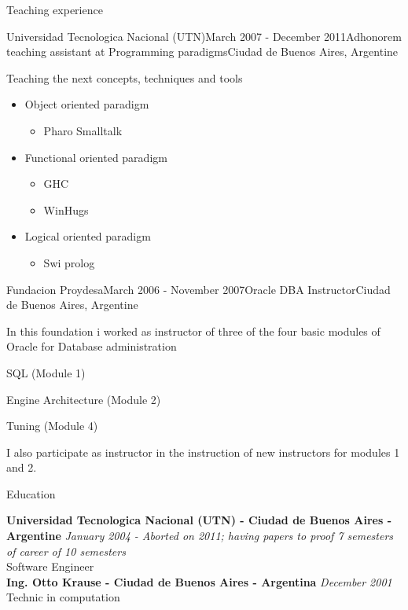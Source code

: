 \documentclass{resume} %
\begin{document}
\begin{rSection}{Teaching experience}
\begin{rSubsection}{Universidad Tecnologica Nacional (UTN)}{March 2007 - December 2011}{Adhonorem teaching assistant at Programming paradigms}{Ciudad de Buenos Aires, Argentine}
\item Teaching the next concepts, techniques and tools
\begin{itemize}
	\item Object oriented paradigm
	\begin{itemize}
		\item Pharo Smalltalk
	\end{itemize}
	\item Functional oriented paradigm
	\begin{itemize}
		\item GHC
		\item WinHugs
	\end{itemize}
	\item Logical oriented paradigm 
	\begin{itemize}
		\item  Swi prolog
	\end{itemize}
\end{itemize}
\end{rSubsection}


\begin{rSubsection}{Fundacion Proydesa}{March 2006 - November 2007}{Oracle DBA Instructor}{Ciudad de Buenos Aires, Argentine}
\item In this foundation i worked as instructor of three of the four basic modules of Oracle for Database administration
\item SQL (Module 1)
\item Engine Architecture (Module 2)
\item Tuning (Module 4)
\item I also participate as instructor in the instruction of new instructors for modules 1 and 2.
\end{rSubsection}


\end{rSection}




\begin{rSection}{Education}


{\bf Universidad Tecnologica Nacional (UTN) - Ciudad de Buenos Aires - Argentine} \hfill {\em January 2004 - Aborted on 2011; having papers to proof 7 semesters of career of 10 semesters } \\ 
Software Engineer  \\

{\bf Ing. Otto Krause - Ciudad de Buenos Aires - Argentina} \hfill {\em December 2001} \\ 
Technic in computation \\
\end{rSection}
\end{document}
